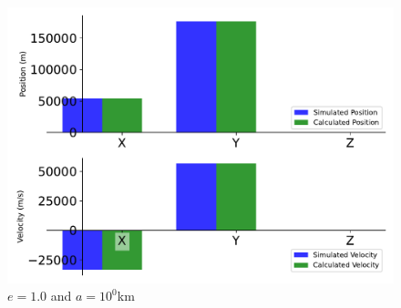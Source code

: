 \begin{figure}[htbp]\centerline{\includegraphics[height=0.7\textwidth, keepaspectratio]{AutoTeX/EquPara_2}}\caption{$e = 1.0$ and $a = 10^0$km}\label{fig:EquPara_2}\end{figure}